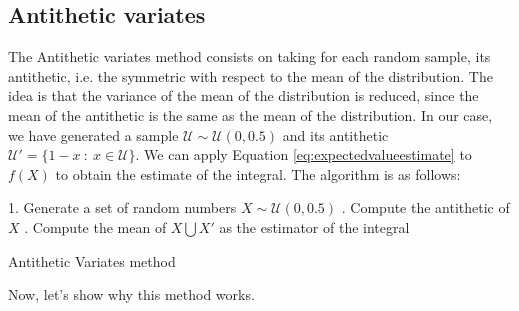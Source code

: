 \documentclass{report}
\begin{document}
\subsection{Antithetic variates}
\label{sec:antithetic_variates}

The Antithetic variates method consists on taking for each random sample, its antithetic, i.e. the symmetric with respect to the mean of the distribution. The idea is that the variance of the mean of the distribution is reduced, since the mean of the antithetic is the same as the mean of the distribution. In our case, we have generated a sample \(\mathcal{U} \sim \mathcal{U}(0,0.5)\) and its antithetic \(\mathcal{U}' = \{1 - x \ : \ x \in \mathcal{U}\}\). We can apply Equation \eqref{eq:expectedvalueestimate} to \(f(X)\) to obtain the estimate of the integral. The algorithm is as follows:

\begin{center}
	\begin{minipage}{0.7\linewidth} %
		\begin{algorithm}[H]
			1. Generate a set of random numbers \(X \sim \mathcal{U}(0,0.5)\) . Compute the antithetic of \(X\) . Compute the mean of \(X \bigcup X'\) as the estimator of the integral \;
			\caption{Antithetic Variates method} %
			\label{alg:antitheticvariates}   %
		\end{algorithm}
	\end{minipage}
\end{center}

Now, let's show why this method works.
\end{document}
